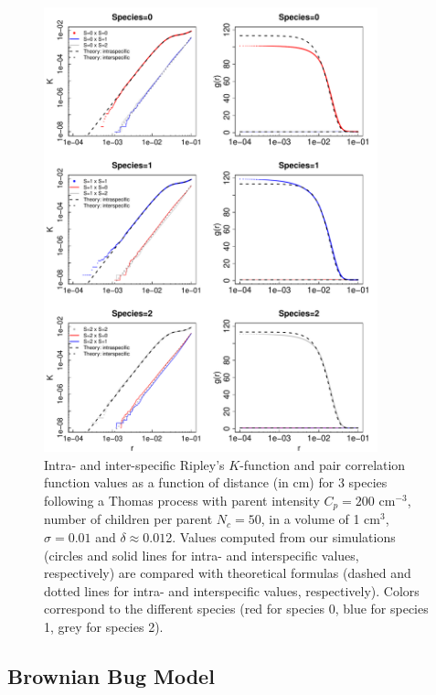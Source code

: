 \documentclass[english]{article}
\begin{document}
\begin{figure}[H]
\begin{centering}
\includegraphics[width=0.86\textwidth]{../code/figure/K_PCF_Thomas}
\par\end{centering}
\caption{Intra- and inter-specific Ripley's $K$-function and pair correlation
function values as a function of distance (in cm) for 3 species following
a Thomas process with parent intensity $C_{p}=200$ cm$^{-3}$, number
of children per parent $N_{c}=50$, in a volume of 1 cm$^{3}$, $\sigma=0.01$
and $\delta\approx0.01$2. Values computed from our simulations (circles
and solid lines for intra- and interspecific values, respectively)
are compared with theoretical formulas (dashed and dotted lines for
intra- and interspecific values, respectively). Colors correspond
to the different species (red for species 0, blue for species 1, grey
for species 2). }
\end{figure}

\subsection{Brownian Bug Model}
\end{document}
